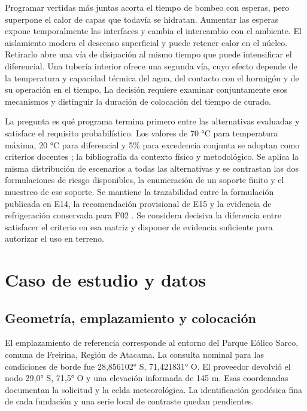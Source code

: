 \documentclass[11pt,a4paper]{article}
\begin{document}
Programar vertidas más juntas acorta el tiempo de bombeo con esperas, pero superpone el calor de capas que todavía se hidratan. Aumentar las esperas expone temporalmente las interfaces y cambia el intercambio con el ambiente. El aislamiento modera el descenso superficial y puede retener calor en el núcleo. Retirarlo abre una vía de disipación al mismo tiempo que puede intensificar el diferencial. Una tubería interior ofrece una segunda vía, cuyo efecto depende de la temperatura y capacidad térmica del agua, del contacto con el hormigón y de su operación en el tiempo. La decisión requiere examinar conjuntamente esos mecanismos y distinguir la duración de colocación del tiempo de curado.

La pregunta es qué programa termina primero entre las alternativas evaluadas y satisface el requisito probabilístico. Los valores de 70 °C para temperatura máxima, 20 °C para diferencial y 5\% para excedencia conjunta se adoptan como criterios docentes \cite{e14}; la bibliografía da contexto físico y metodológico. Se aplica la misma distribución de escenarios a todas las alternativas y se contrastan las dos formulaciones de riesgo disponibles, la enumeración de un soporte finito y el muestreo de ese soporte. Se mantiene la trazabilidad entre la formulación publicada en E14, la recomendación provisional de E15 y la evidencia de refrigeración conservada para F02 \cite{e14,e15,f02}. Se considera decisiva la diferencia entre satisfacer el criterio en esa matriz y disponer de evidencia suficiente para autorizar el uso en terreno.

\section{Caso de estudio y datos}
\subsection*{Geometría, emplazamiento y colocación}
El emplazamiento de referencia corresponde al entorno del Parque Eólico Sarco, comuna de Freirina, Región de Atacama. La consulta nominal para las condiciones de borde fue 28,856102° S, 71,421831° O. El proveedor devolvió el nodo 29,0° S, 71,5° O y una elevación informada de 145 m. Esas coordenadas documentan la solicitud y la celda meteorológica. La identificación geodésica fina de cada fundación y una serie local de contraste quedan pendientes.
\end{document}
